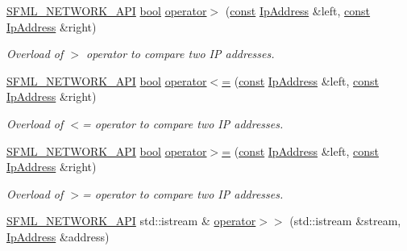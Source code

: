 \begin{DoxyCompactItemize}
\hyperlink{sfml_2dep_2_s_f_m_l-2_84_82_2include_2_s_f_m_l_2_network_2_export_8hpp_ac5d46d4ffd98e947e28c54d051b338e7}{S\-F\-M\-L\-\_\-\-N\-E\-T\-W\-O\-R\-K\-\_\-\-A\-P\-I} \hyperlink{term__entry_8h_a002004ba5d663f149f6c38064926abac}{bool} \hyperlink{namespacesf_a7344fe65b9ee438bab496c9889a34202}{operator$>$} (\hyperlink{term__entry_8h_a57bd63ce7f9a353488880e3de6692d5a}{const} \hyperlink{classsf_1_1_ip_address}{Ip\-Address} \&left, \hyperlink{term__entry_8h_a57bd63ce7f9a353488880e3de6692d5a}{const} \hyperlink{classsf_1_1_ip_address}{Ip\-Address} \&right)
\begin{DoxyCompactList}\small\item\em Overload of $>$ operator to compare two I\-P addresses. \end{DoxyCompactList}\item 
\hyperlink{sfml_2dep_2_s_f_m_l-2_84_82_2include_2_s_f_m_l_2_network_2_export_8hpp_ac5d46d4ffd98e947e28c54d051b338e7}{S\-F\-M\-L\-\_\-\-N\-E\-T\-W\-O\-R\-K\-\_\-\-A\-P\-I} \hyperlink{term__entry_8h_a002004ba5d663f149f6c38064926abac}{bool} \hyperlink{namespacesf_aeb411e03dd15af718fe95ed4626190ad}{operator$<$=} (\hyperlink{term__entry_8h_a57bd63ce7f9a353488880e3de6692d5a}{const} \hyperlink{classsf_1_1_ip_address}{Ip\-Address} \&left, \hyperlink{term__entry_8h_a57bd63ce7f9a353488880e3de6692d5a}{const} \hyperlink{classsf_1_1_ip_address}{Ip\-Address} \&right)
\begin{DoxyCompactList}\small\item\em Overload of $<$= operator to compare two I\-P addresses. \end{DoxyCompactList}\item 
\hyperlink{sfml_2dep_2_s_f_m_l-2_84_82_2include_2_s_f_m_l_2_network_2_export_8hpp_ac5d46d4ffd98e947e28c54d051b338e7}{S\-F\-M\-L\-\_\-\-N\-E\-T\-W\-O\-R\-K\-\_\-\-A\-P\-I} \hyperlink{term__entry_8h_a002004ba5d663f149f6c38064926abac}{bool} \hyperlink{namespacesf_a457fb40b390861abae4234f6059d1c48}{operator$>$=} (\hyperlink{term__entry_8h_a57bd63ce7f9a353488880e3de6692d5a}{const} \hyperlink{classsf_1_1_ip_address}{Ip\-Address} \&left, \hyperlink{term__entry_8h_a57bd63ce7f9a353488880e3de6692d5a}{const} \hyperlink{classsf_1_1_ip_address}{Ip\-Address} \&right)
\begin{DoxyCompactList}\small\item\em Overload of $>$= operator to compare two I\-P addresses. \end{DoxyCompactList}\item 
\hyperlink{sfml_2dep_2_s_f_m_l-2_84_82_2include_2_s_f_m_l_2_network_2_export_8hpp_ac5d46d4ffd98e947e28c54d051b338e7}{S\-F\-M\-L\-\_\-\-N\-E\-T\-W\-O\-R\-K\-\_\-\-A\-P\-I} std\-::istream \& \hyperlink{namespacesf_a9200951bb2c741b0ae01d1d1831d92ff}{operator$>$$>$} (std\-::istream \&stream, \hyperlink{classsf_1_1_ip_address}{Ip\-Address} \&address)

\end{DoxyCompactItemize}

